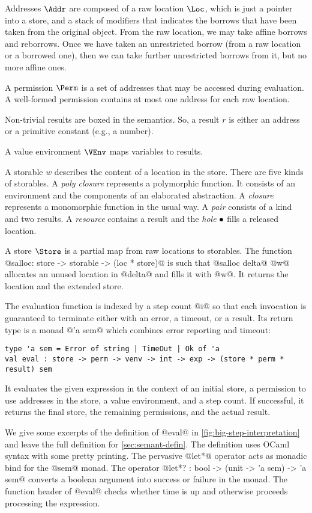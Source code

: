 Addresses $\Addr$ are composed of a raw location $\Loc$, which is just
a pointer into a store, and a stack of modifiers that indicates the
borrows that have been taken from the original object. From the raw
location, we may take affine borrows and reborrows. Once we have
taken an unrestricted borrow (from a raw location or a borrowed one),
then we can take further unrestricted borrows from it, but no more
affine ones.

A permission $\Perm$ is a set of addresses that may be accessed during
evaluation. A well-formed permission contains at most one address for each raw
location.

Non-trivial results are boxed in the  semantics. So, a result
$r$ is either an address or a primitive constant (e.g., a number).

A value environment $\VEnv$  maps variables to results.

A storable $w$ describes the content of a location in the store. There are five
kinds of storables. A \emph{poly closure} represents a polymorphic
function. It consists of an environment and the components of an
elaborated abstraction. A \emph{closure} represents a monomorphic
function in the usual way. A \emph{pair}
consists of a kind and two results. A \emph{resource} contains
a result and the \emph{hole} $\bullet$ fills a released location.

A store $\Store$ is a partial map from raw locations to
storables. The function
@salloc: store -> storable -> (loc * store)@ is such that
@salloc delta@ @w@ allocates an unused location in @delta@ and fills it with
@w@. It returns the location and the extended store.


The evaluation function is indexed by a step count @i@ so that each
invocation is guaranteed to terminate either with an error, a timeout,
or a result. Its return type is a monad
@'a sem@ which combines error reporting and timeout:
\begin{lstlisting}
type 'a sem = Error of string | TimeOut | Ok of 'a
val eval : store -> perm -> venv -> int -> exp -> (store * perm * result) sem
\end{lstlisting}
It evaluates the given expression in the context of an initial store, a
permission to use addresses in the store, a value environment, and a
step count. If successful, it returns the final store, the remaining
permissions, and the actual result.



We give some excerpts of the definition of @eval@ in
\cref{fig:big-step-interpretation} and leave the full
definition for \cref{sec:semant-defin}.
The definition uses OCaml syntax with some pretty
printing. The pervasive @let*@ operator acts as monadic bind
for the @sem@ monad. The operator
@let*? : bool -> (unit -> 'a sem) -> 'a sem@
 converts a boolean
argument into success or failure in the monad.
 The function header of @eval@ checks
whether time is up and otherwise proceeds processing the expression.

